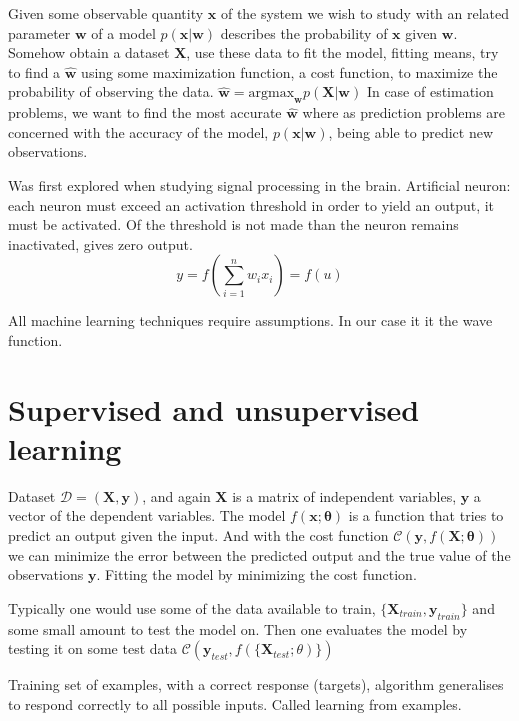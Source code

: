 Given some observable quantity $\mathbf{x}$ of the system we wish to study with an related parameter $\mathbf{w}$ of a model $p(\mathbf{x}|\mathbf{w})$ describes the probability of $\mathbf{x}$ given $\mathbf{w}$.
Somehow obtain a dataset $\mathbf{X}$, use these data to fit the model, fitting means, try to find a $\hat{\mathbf{w}}$ using some maximization function, a cost function, to maximize the probability of observing the data. 
$\hat{\mathbf{w}} = \text{argmax}_{\mathbf{w}}{p(\mathbf{X}|\mathbf{w})}$
In case of estimation problems, we want to find the most accurate $\hat{\mathbf{w}}$ where as prediction problems are concerned with the accuracy of the model, $p(\mathbf{x}|\mathbf{w})$, being able to predict new observations. 

Was first explored when studying signal processing in the brain. 
Artificial neuron: each neuron must exceed an activation threshold in order to yield an output, it must be activated. Of the threshold is not made than the neuron remains inactivated, gives zero output.
\begin{equation}
y = f \left( \sum_{i=1}^n w_i x_i \right) = f(u)
\end{equation}

All machine learning techniques require assumptions. In our case it it the wave function. 

\section{Supervised and unsupervised learning}

Dataset $\mathcal{D} =(\mathbf{X}, \mathbf{y})$, and again $\mathbf{X}$ is a matrix of independent variables, $\mathbf{y}$ a vector of the dependent variables. The model $f(\mathbf{x}; \mathbf{\theta})$ is a function that tries to predict an output given the input. And with the cost function $\mathcal{C}(\mathbf{y}, f(\mathbf{X};\mathbf{\theta}))$ we can minimize the error between the predicted output and the true value of the observations $\mathbf{y}$. Fitting the model by minimizing the cost function.

Typically one would use some of the data available to train, $\{\mathbf{X}_{train}, \mathbf{y}_{train}\}$ and some small amount to test the model on.
Then one evaluates the model by testing it on some test data $\mathcal{C}(\mathbf{y}_{test}, f(\{\mathbf{X}_{test}; \theta)\})$



Training set of examples, with a correct response (targets), algorithm generalises to respond correctly to all possible inputs. Called learning from examples.

